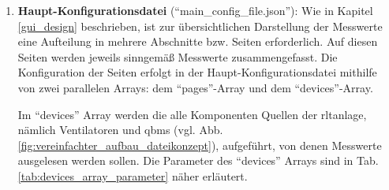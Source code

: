 \begin{enumerate}
	\item \textbf{Haupt-Konfigurationsdatei} (\enquote{main\_config\_file.json}):
	Wie in Kapitel \ref{gui_design} beschrieben, ist zur übersichtlichen Darstellung der Messwerte eine Aufteilung in mehrere Abschnitte bzw. Seiten erforderlich. Auf diesen Seiten werden jeweils sinngemäß Messwerte zusammengefasst. Die Konfiguration der Seiten erfolgt in der Haupt-Konfigurationsdatei mithilfe von zwei parallelen Arrays: dem \enquote{pages}-Array und dem \enquote{devices}-Array. 	
	
	Im \enquote{devices} Array werden die alle Komponenten \bzw Quellen der \acs{rltanlage}, nämlich Ventilatoren und \gls{qbm}s (vgl. Abb. \ref{fig:vereinfachter_aufbau_dateikonzept}), aufgeführt, von denen Messwerte ausgelesen werden sollen. Die Parameter des \enquote{devices} Arrays sind in Tab. \ref{tab:devices_array_parameter} näher erläutert.


\end{enumerate}

